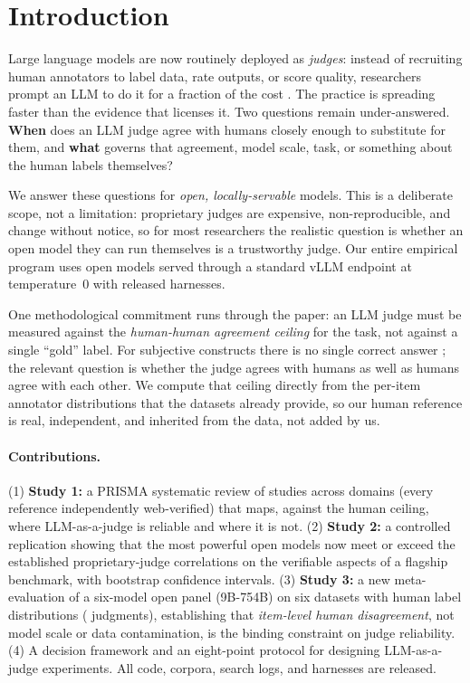 \section{Introduction}
Large language models are now routinely deployed as \emph{judges}: instead of recruiting human annotators to label
data, rate outputs, or score quality, researchers prompt an LLM to do it for a fraction of the cost
\citep{zheng2023mtbench,liu2023geval,gilardi2023chatgpt}. The practice is spreading faster than the evidence that
licenses it. Two questions remain under-answered. \textbf{When} does an LLM judge agree with humans closely enough to
substitute for them, and \textbf{what} governs that agreement, model scale, task, or something about the human
labels themselves?

We answer these questions for \emph{open, locally-servable} models. This is a deliberate scope, not a limitation:
proprietary judges are expensive, non-reproducible, and change without notice, so for most researchers the realistic
question is whether an open model they can run themselves is a trustworthy judge. Our entire empirical program uses
open models served through a standard vLLM endpoint at temperature~0 with released harnesses.

One methodological commitment runs through the paper: an LLM judge must be measured against the \emph{human-human
agreement ceiling} for the task, not against a single ``gold'' label. For subjective constructs there is no single
correct answer \citep{aroyo2015truth,plank2022humanlabel}; the relevant question is whether the judge agrees with
humans as well as humans agree with each other. We compute that ceiling directly from the per-item annotator
distributions that the datasets already provide, so our human reference is real, independent, and inherited from the
data, not added by us.

\paragraph{Contributions.} (1) \textbf{Study 1:} a PRISMA systematic review of \Nstudies{} studies across
\Ndomains{} domains (every reference independently web-verified) that maps, against the human ceiling, where
LLM-as-a-judge is reliable and where it is not. (2) \textbf{Study 2:} a controlled replication showing that the most
powerful open models now meet or exceed the established proprietary-judge correlations on the verifiable aspects of a
flagship benchmark, with bootstrap confidence intervals. (3) \textbf{Study 3:} a new meta-evaluation of a six-model
open panel (9B-754B) on six datasets with human label distributions (\STHRn{} judgments), establishing that
\emph{item-level human disagreement}, not model scale or data contamination, is the binding constraint on judge
reliability. (4) A decision framework and an eight-point protocol for designing LLM-as-a-judge experiments. All
code, corpora, search logs, and harnesses are released.
